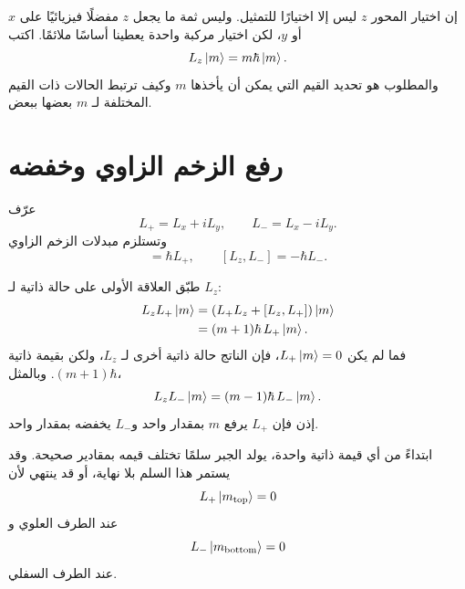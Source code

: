 إن اختيار المحور \(z\) ليس إلا اختيارًا للتمثيل. وليس ثمة ما يجعل \(z\) مفضلًا فيزيائيًا على \(x\) أو \(y\)، لكن اختيار مركبة واحدة يعطينا أساسًا ملائمًا. اكتب
\begin{equation}
L_z\left\lvert m\right\rangle=m\hbar\left\lvert m\right\rangle.
\end{equation}
والمطلوب هو تحديد القيم التي يمكن أن يأخذها \(m\) وكيف ترتبط الحالات ذات القيم المختلفة لـ \(m\) بعضها ببعض.

\begin{classroomqa}
\end{classroomqa}

\section{رفع الزخم الزاوي وخفضه}

عرّف
\begin{equation}
L_+=L_x+iL_y,
\qquad
L_-=L_x-iL_y.
\end{equation}
وتستلزم مبدلات الزخم الزاوي
\begin{equation}
[L_z,L_+]=\hbar L_+,
\qquad
[L_z,L_-]=-\hbar L_-.
\end{equation}

طبّق العلاقة الأولى على حالة ذاتية لـ \(L_z\):
\begin{align}
L_zL_+\left\lvert m\right\rangle
&=\left(L_+L_z+[L_z,L_+]\right)\left\lvert m\right\rangle\\
&=(m+1)\hbar\,L_+\left\lvert m\right\rangle.
\end{align}
فما لم يكن \(L_+\left\lvert m\right\rangle=0\)، فإن الناتج حالة ذاتية أخرى لـ \(L_z\)، ولكن بقيمة ذاتية \((m+1)\hbar\). وبالمثل،
\begin{equation}
L_zL_-\left\lvert m\right\rangle
=(m-1)\hbar\,L_-\left\lvert m\right\rangle.
\end{equation}
إذن فإن \(L_+\) يرفع \(m\) بمقدار واحد و\(L_-\) يخفضه بمقدار واحد.

ابتداءً من أي قيمة ذاتية واحدة، يولد الجبر سلمًا تختلف قيمه بمقادير صحيحة. وقد يستمر هذا السلم بلا نهاية، أو قد ينتهي لأن
\begin{equation}
L_+\left\lvert m_{\mathrm{top}}\right\rangle=0
\end{equation}
عند الطرف العلوي و
\begin{equation}
L_-\left\lvert m_{\mathrm{bottom}}\right\rangle=0
\end{equation}
عند الطرف السفلي.

